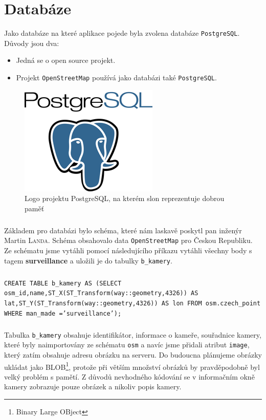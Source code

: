 \chapter{Databáze}
Jako databáze na které aplikace pojede byla zvolena databáze \texttt{PostgreSQL}. Důvody jsou dva:
\begin{itemize}
\item Jedná se o open source projekt.
\item Projekt \texttt{OpenStreetMap} používá jako databázi také \texttt{PostgreSQL}.
\end{itemize}
\begin{figure}[!ht]
\begin{center}
\includegraphics[scale=0.5]{pics/postgresql_logo.png}
\caption{Logo projektu PostgreSQL, na kterém slon reprezentuje dobrou pamě\v{t}}
\end{center}
\end{figure}
\paragraph{}
Základem pro databázi bylo schéma, které nám laskavě poskytl pan inženýr Martin \textsc{Landa}. Schéma obsahovalo data \texttt{OpenStreetMap} pro Českou Republiku. Ze schématu jsme vytáhli pomocí následujícího příkazu vytáhli všechny body s tagem \textbf{surveillance} a uložili je do tabulky \texttt{b\_kamery}.
\paragraph{}
\texttt{CREATE TABLE b\_kamery AS (SELECT osm\_id,name,ST\_X(ST\_Transform(way::geometry,4326)) AS lat,ST\_Y(ST\_Transform(way::geometry,4326)) AS lon FROM osm.czech\_point WHERE man\_made ='surveillance');}
\paragraph{}
Tabulka \texttt{b\_kamery} obsahuje identifikátor, informace o kameře, souřadnice kamery, které byly naimportovány ze schématu \texttt{osm} a navíc jsme přidali atribut \texttt{image}, který zatím obsahuje adresu obrázku na serveru. Do budoucna plánujeme obrázky ukládat jako BLOB\footnote{Binary Large OBject}, protože při větším množství obrázků by pravděpodobně byl velký problém s pamětí. Z důvodů nevhodného k\'{o}dování se v informačním okně kamery zobrazuje pouze obrázek a nikoliv popis kamery.
